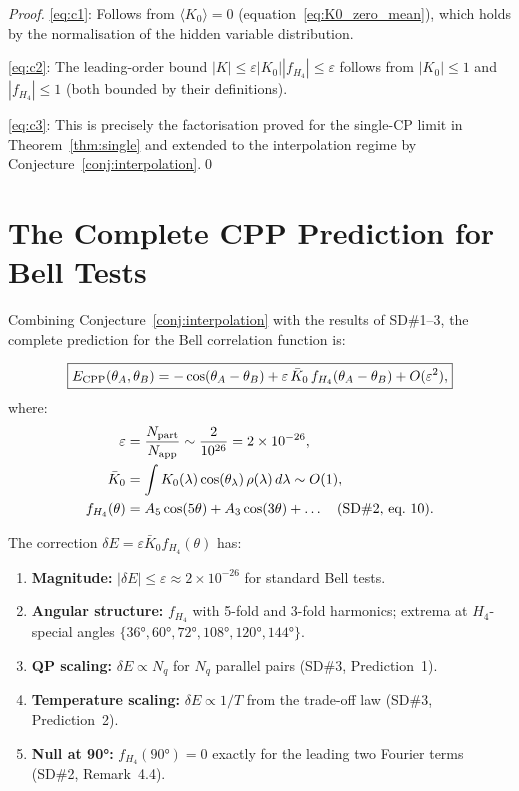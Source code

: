 \documentclass[11pt,letterpaper]{article}
\newcommand{\eps}{\varepsilon}
\newcommand{\Napp}{N_{\rm app}}
\newcommand{\Npart}{N_{\rm part}}
\begin{document}
\begin{proof}
\eqref{eq:c1}: Follows from $\langle K_0\rangle = 0$
(equation~\eqref{eq:K0_zero_mean}), which holds by the normalisation
of the hidden variable distribution.

\eqref{eq:c2}: The leading-order bound $|K| \leq \eps |K_0|
|f_{H_4}| \leq \eps$ follows from $|K_0| \leq 1$ and $|f_{H_4}|
\leq 1$ (both bounded by their definitions).

\eqref{eq:c3}: This is precisely the factorisation proved for
the single-CP limit in Theorem~\ref{thm:single} and extended to
the interpolation regime by Conjecture~\ref{conj:interpolation}.\qed
\end{proof}

\section{The Complete CPP Prediction for Bell Tests}
\label{sec:prediction}

Combining Conjecture~\ref{conj:interpolation} with the results of
SD\#1--3, the complete prediction for the Bell correlation function is:

\begin{equation}
\boxed{
E_{\rm CPP}(\theta_A,\theta_B)
= -\cos(\theta_A-\theta_B)
+ \eps\,\bar K_0\,f_{H_4}(\theta_A-\theta_B)
+ O(\eps^2),
}
\label{eq:E_CPP_final}
\end{equation}
where:
\begin{align}
\eps &= \frac{\Npart}{\Napp} \sim \frac{2}{10^{26}} = 2\times10^{-26},
  \label{eq:eps_value} \\
\bar K_0 &= \int K_0(\lambda)\cos(\theta_\lambda)\,\rho(\lambda)\,d\lambda
  \sim O(1),
  \label{eq:K0bar} \\
f_{H_4}(\theta) &= A_5\cos(5\theta) + A_3\cos(3\theta) + \ldots
  \quad\text{(SD\#2, eq.~10)}.
  \label{eq:fH4_recall}
\end{align}

The correction $\delta E = \eps\bar K_0 f_{H_4}(\theta)$ has:
\begin{enumerate}
\item \textbf{Magnitude:} $|\delta E| \leq \eps \approx 2\times10^{-26}$
  for standard Bell tests.
\item \textbf{Angular structure:} $f_{H_4}$ with 5-fold and 3-fold
  harmonics; extrema at $H_4$-special angles $\{36°, 60°, 72°,
  108°, 120°, 144°\}$.
\item \textbf{QP scaling:} $\delta E \propto N_q$ for $N_q$ parallel
  pairs (SD\#3, Prediction~1).
\item \textbf{Temperature scaling:} $\delta E \propto 1/T$ from
  the trade-off law (SD\#3, Prediction~2).
\item \textbf{Null at 90°:} $f_{H_4}(90°) = 0$ exactly for the
  leading two Fourier terms (SD\#2, Remark~4.4).
\end{enumerate}
\end{document}
